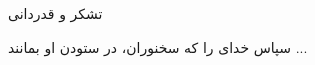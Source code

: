 \clearpage
\thispagestyle{empty}

{\BZarScaleOne
{\fontsize{20pt}{0}\selectfont
\noindent
تشکر و قدردانی
}}
\vspace{0.5cm}

{\BZarScaleOne
{\fontsize{12pt}{0.9cm}\selectfont %
\noindent
سپاس خدای را که سخنوران، در ستودن او بمانند ...
}}

\restoregeometry